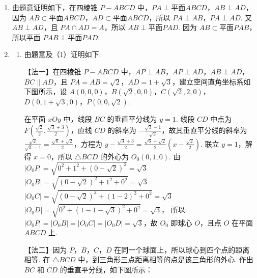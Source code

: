 \documentclass[UTF8,a4paper,oneside,11pt]{ctexbook}
\begin{document}
\begin{solution}
\begin{enumerate}
\item 由题意证明如下，在四棱锥 \(P - ABCD\) 中，\(PA \perp \text{平面} ABCD\)，\(AB \perp AD\)，因为 \(AB \subset \text{平面} ABCD\)，\(AD \subset \text{平面} ABCD\)，所以 \(PA \perp AB\)，\(PA \perp AD\). 又 \(AB \perp AD\)，且 \(PA \cap AD = A\)，所以 \(AB \perp \text{平面} PAD\). 因为 \(AB \subset \text{平面} PAB\)，所以平面 \(PAB \perp \text{平面} PAD\).

\item
\begin{enumerate}
\item 由题意及（1）证明如下.

【法一】在四棱锥 \(P - ABCD\) 中，\(AP \perp AB\)，\(AP \perp AD\)，\(AB \perp AD\)，\(BC \parallel AD\)，且 \(PA = AB = \sqrt{2}\)，\(AD = 1 + \sqrt{3}\)，建立空间直角坐标系如下图所示，设 \(A(0,0,0)\)，\(B(\sqrt{2},0,0)\)，\(C(\sqrt{2},2,0)\)，\(D(0,1+\sqrt{3},0)\)，\(P(0,0,\sqrt{2})\).



在平面 \(xOy\) 中，线段 \(BC\) 的垂直平分线为 \(y=1\). 线段 \(CD\) 中点为 \(F\left(\frac{\sqrt{2}}{2},\frac{\sqrt{3}+3}{2}\right)\)，直线 \(CD\) 的斜率为 \(-\frac{\sqrt{3}-1}{\sqrt{2}}\)，故其垂直平分线的斜率为 \(\frac{\sqrt{2}}{\sqrt{3}-1}=\frac{\sqrt{6}+\sqrt{2}}{2}\)，方程为
\(y-\frac{\sqrt{3}+3}{2}=\frac{\sqrt{6}+\sqrt{2}}{2}\left(x-\frac{\sqrt{2}}{2}\right)\).
联立 \(y=1\)，解得 \(x=0\)，所以 \(\triangle BCD\) 的外心为 \(O_0(0,1,0)\). 由
\(
|O_0P| = \sqrt{0^2 + 1^2 + (0-\sqrt{2})^2} = \sqrt{3}
\)
\(
|O_0B| = \sqrt{(0-\sqrt{2})^2 + 1^2 + 0^2} = \sqrt{3}
\)
\(
|O_0C| = \sqrt{(0-\sqrt{2})^2 + (1-2)^2 + 0^2} = \sqrt{3}
\)
\(
|O_0D| = \sqrt{0^2 + (1-1-\sqrt{3})^2 + 0^2} = \sqrt{3}
\)，
所以 \(|O_0P|=|O_0B|=|O_0C|=|O_0D|=\sqrt{3}\)，故 \(O_0\) 即球心 \(O\)，且点 \(O\) 在平面 \(ABCD\) 上.

【法二】因为 \(P\)，\(B\)，\(C\)，\(D\) 在同一个球面上，所以球心到四个点的距离相等.
在 \(\triangle BCD\) 中，到三角形三点距离相等的点是该三角形的外心. 作出 \(BC\) 和 \(CD\) 的垂直平分线，如下图所示：



\end{enumerate}
\end{enumerate}
\end{solution}
\end{document}
